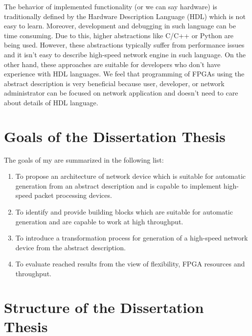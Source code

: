 The behavior of implemented functionality (or we can say hardware) is traditionally defined by the Hardware Description Language (HDL) which is not easy to 
learn. Moreover, development and debugging in such language can be time consuming. 
Due to this, higher abstractions like C/C++ or Python are being used. 
However, these abstractions typically suffer from performance issues and it isn't easy to describe high-speed network engine
in such language. On the other hand, these approaches are suitable for developers who don't have experience with HDL languages.
We feel that programming of FPGAs using the abstract description is very beneficial because user, developer, or network administrator can be
focused on network application and doesn't need to care about details of HDL language.

\section{Goals of the Dissertation Thesis}
The goals of my \thesis{} are summarized in the following list:
\begin{enumerate}
    \item To propose an architecture of network device which is suitable for automatic generation from an abstract description and is
    capable to implement high-speed packet processing devices.
    \item To identify and provide building blocks which are suitable for automatic generation and are capable 
    to work at high throughput.
    \item To introduce a transformation process for generation of a high-speed network device from the abstract description.
    \item To evaluate reached results from the view of flexibility, FPGA resources and throughput.
\end{enumerate}

\section{Structure of the Dissertation Thesis}

